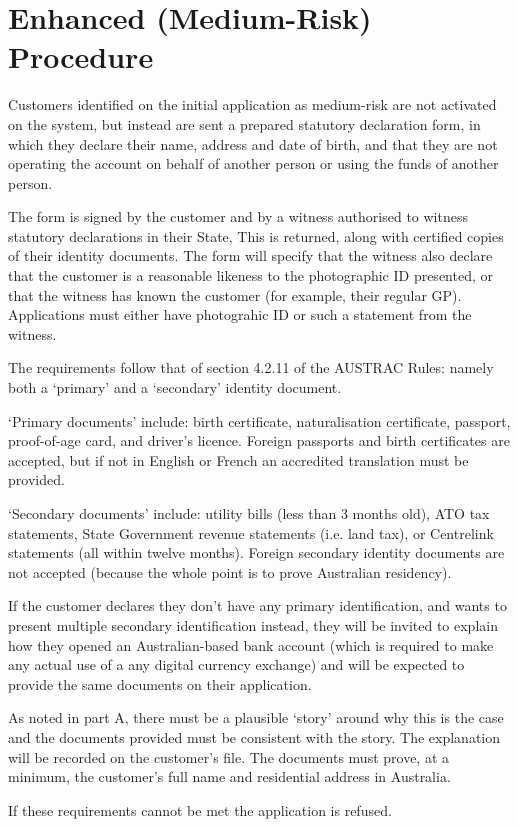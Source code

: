 \documentclass[12pt]{report}
\begin{document}
\section{Enhanced (Medium-Risk) Procedure} \label{enhanced}

Customers identified on the initial application as medium-risk are not activated on the system, but instead are
sent a prepared statutory declaration form, in which they declare their name, address and date of birth, and
that they are not operating the account on behalf of another person or using the funds of another person.

The form is signed by the customer and by a witness authorised to witness statutory declarations in their State,
This is returned, along with certified copies of their identity documents. The form will specify that the
witness also declare that the customer is a reasonable likeness to the photographic ID presented, or
that the witness has known the customer (for example, their regular GP). Applications must either
have photograhic ID or such a statement from the witness.

The requirements follow that of section 4.2.11 of the AUSTRAC Rules: namely both a `primary' and a `secondary' identity
document.

`Primary documents' include: birth certificate, naturalisation certificate, passport, proof-of-age card,
and driver's licence. Foreign passports and birth certificates are accepted, but if not in English or French
an accredited translation must be provided.

`Secondary documents' include: utility bills (less than 3 months old), ATO tax statements,
State Government revenue statements (i.e. land tax), or Centrelink statements (all within twelve months). Foreign
secondary identity documents are not accepted (because the whole point is to prove Australian residency).

If the customer declares they don't have any primary identification, and wants to present multiple secondary identification
instead, they will be invited to explain how they opened an Australian-based bank account (which is required to
make any actual use of a any digital currency exchange) and will be expected to provide the same documents on their
application.

As noted in part A, there must be a plausible `story' around why this is the case and the documents provided must
be consistent with the story. The explanation will be recorded on the customer's file.
The documents must prove, at a minimum, the customer's full name and residential address in Australia.

If these requirements cannot be met the application is refused.
\end{document}
